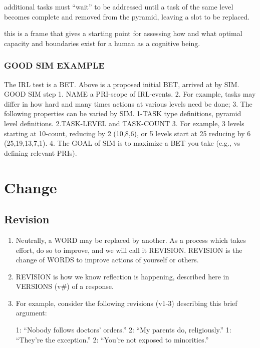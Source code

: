 \documentclass[
]{book}
\begin{document}
additional tasks must ``wait'' to be addressed until a task of the same level becomes complete and removed from the pyramid, leaving a slot to be replaced.

this is a frame that gives a starting point for assessing how and what optimal capacity and boundaries exist for a human as a cognitive being.

\hypertarget{good-sim-example}{%
\subsection{GOOD SIM EXAMPLE}\label{good-sim-example}}

The IRL test is a BET. Above is a proposed initial BET, arrived at by SIM.
GOOD SIM step
1. NAME a PRI-scope of IRL-events.
2. For example, tasks may differ in how hard and many times actions at various levels need be done;
3. The following properties can be varied by SIM.
1-TASK type definitions, pyramid level definitions.
2.TASK-LEVEL and TASK-COUNT
3. For example, 3 levels starting at 10-count, reducing by 2 (10,8,6), or 5 levels start at 25 reducing by 6 (25,19,13,7,1).
4. The GOAL of SIM is to maximize a BET you take (e.g., vs defining relevant PRIs).

\hypertarget{change}{%
\chapter{Change}\label{change}}

\hypertarget{revision}{%
\section{Revision}\label{revision}}

\begin{enumerate}
\def\labelenumi{\arabic{enumi}.}
\setcounter{enumi}{24}
\item
  Neutrally, a WORD may be replaced by another. As a process which takes effort, do so to improve, and we will call it REVISION. REVISION is the change of WORDS to improve actions of yourself or others.
\item
  REVISION is how we know reflection is happening, described here in VERSIONS (v\#) of a response.
\item
  For example, consider the following revisions (v1-3) describing this
  brief argument:

  1: ``Nobody follows doctors' orders.''
  2: ``My parents do, religiously.''
  1: ``They're the exception.''
  2: ``You're not exposed to minorities.''
\end{enumerate}
\end{document}
